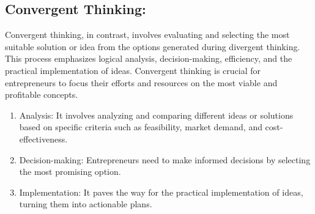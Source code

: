 \documentclass[12pt]{report}
\begin{document}
\subsection*{Convergent Thinking:} Convergent thinking, in contrast, involves evaluating and selecting the most suitable solution or idea from the options generated during divergent thinking. This process emphasizes logical analysis, decision-making, efficiency, and the practical implementation of ideas. Convergent thinking is crucial for entrepreneurs to focus their efforts and resources on the most viable and profitable concepts.\cite{convergent}
\begin{enumerate}
    \item Analysis: It involves analyzing and comparing different ideas or solutions based on specific criteria such as feasibility, market demand, and cost-effectiveness.
    \item Decision-making: Entrepreneurs need to make informed decisions by selecting the most promising option.
    \item Implementation:  It paves the way for the practical implementation of ideas, turning them into actionable plans.
\end{enumerate}
\end{document}
